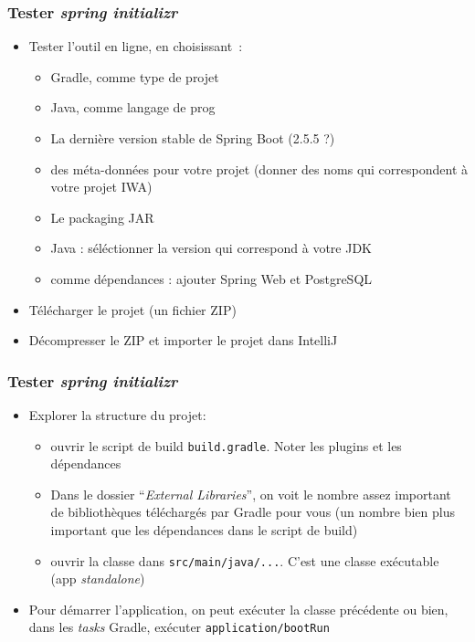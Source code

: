 \documentclass{beamer}
\begin{document}
\begin{frame}
	\frametitle{Tester \textit{spring initializr}}
	\begin{itemize}
		\item Tester l'outil en ligne, en choisissant~:
		\begin{itemize}
			\item Gradle, comme type de projet
			\item Java, comme langage de prog
			\item La dernière version stable de Spring Boot (2.5.5 ?)
			\item des méta-données pour votre projet (donner des noms qui correspondent à votre projet IWA)
			\item Le packaging JAR
			\item Java : séléctionner la version qui correspond à votre JDK
			\item comme dépendances : ajouter Spring Web et PostgreSQL
		\end{itemize}
	\item Télécharger le projet (un fichier ZIP)
	\item Décompresser le ZIP et importer le projet dans IntelliJ
\end{itemize}
\end{frame}

\begin{frame}
\frametitle{Tester \textit{spring initializr}}
\begin{itemize}	
	\item Explorer la structure du projet:
	
	\begin{itemize}
		\item ouvrir le script de build \texttt{build.gradle}. Noter les plugins et les dépendances
		\item Dans le dossier ``\textit{External Libraries}'', on voit le nombre assez important de bibliothèques téléchargés par Gradle pour vous (un nombre bien plus important que les dépendances dans le script de build)
		
		\item ouvrir la classe dans \texttt{src/main/java/...}. C'est une classe exécutable (app \textit{standalone})
		
	\end{itemize}
	\item Pour démarrer l'application, on peut exécuter la classe précédente ou bien, dans les \textit{tasks} Gradle, exécuter \texttt{application/bootRun}
	\end{itemize}
\end{frame}
\end{document}
